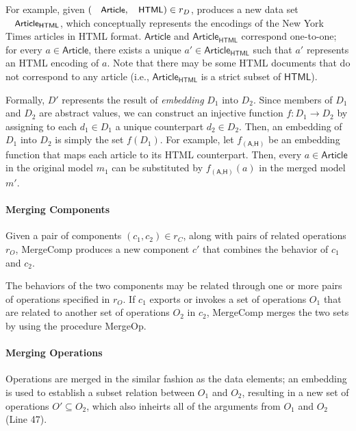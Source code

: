 For example, given $(\txtcname{Article}, \txtcname{HTML}) \in r_{D}$,  produces a new data set $\txtcname{Article}_{\textsf{HTML}}$, which conceptually represents the encodings of the New York Times articles in HTML format. $\textsf{Article}$ and $\textsf{Article}_{\textsf{HTML}}$ correspond one-to-one; for every $a \in \textsf{Article}$, there exists a unique $a' \in \textsf{Article}_{\textsf{HTML}}$ such that $a'$ represents an HTML encoding of $a$. Note that there may be some HTML documents that do not correspond to any article (i.e., $\textsf{Article}_{\textsf{HTML}}$ is a strict subset of $\textsf{HTML}$).

Formally, $D'$ represents the result of \textit{embedding} $D_{1}$ into
$D_{2}$. Since members of $D_{1}$ and $D_{2}$ are abstract values, we can
construct an injective function $f : D_{1} \rightarrow D_{2}$ by assigning
to each $d_{1} \in D_{1}$ a unique counterpart $d_{2} \in D_{2}$. Then, an
embedding of $D_{1}$ into $D_{2}$ is simply the set $f(D_{1})$. For example,
let $f_{(\textsf{A,H})}$ be an embedding function that maps each
article to its HTML counterpart. Then, every $a \in \textsf{Article}$
in the original model $m_{1}$ can be substituted by
$f_{(\textsf{A,H})}(a)$ in the merged model $m'$.


\paragraph{\textbf{Merging Components}} Given a pair of components
$(c_{1}, c_{2}) \in r_{C}$, along with pairs of related operations $r_{O}$,
\textsf{MergeComp} produces a new component $c'$ that combines the
behavior of $c_{1}$ and $c_{2}$.

The behaviors of the two components may be related through one or more
pairs of operations specified in $r_{O}$. If $c_{1}$ exports or invokes
a set of operations $O_{1}$ that are related to another set of operations
$O_{2}$ in $c_{2}$, \textsf{MergeComp} merges the two sets by using the
procedure \textsf{MergeOp}. 


\paragraph{\textbf{Merging Operations}} Operations are merged in the
similar fashion as the data elements; an embedding is used to
establish a subset relation between $O_{1}$ and $O_{2}$, resulting in a new
set of operations $O' \subseteq O_{2}$, which also inheirts all of the
arguments from $O_{1}$ and $O_{2}$ (Line 47).

